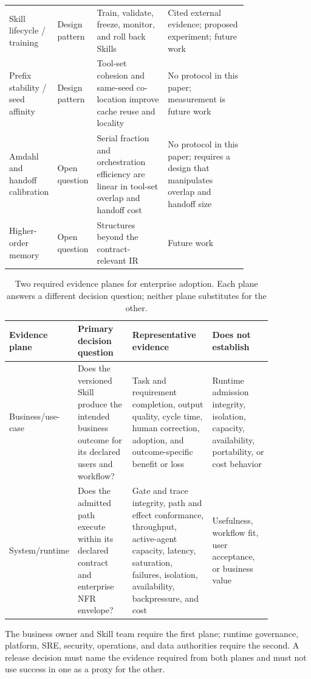 \begin{table}[t]
\begin{tabular}{lp{0.14\linewidth}p{0.30\linewidth}p{0.34\linewidth}}
Skill lifecycle / training & Design pattern & Train, validate, freeze, monitor, and roll back Skills & Cited external evidence; proposed experiment; future work \\
Prefix stability / seed affinity & Design pattern & Tool-set cohesion and same-seed co-location improve cache reuse and locality & No protocol in this paper; measurement is future work \\
Amdahl and handoff calibration & Open question & Serial fraction and orchestration efficiency are linear in tool-set overlap and handoff cost & No protocol in this paper; requires a design that manipulates overlap and handoff size \\
Higher-order memory & Open question & Structures beyond the contract-relevant IR & Future work \\
\hline
\end{tabular}
\end{table}

\begin{table}[t]
\centering
\caption{Two required evidence planes for enterprise adoption. Each plane answers a different decision question; neither plane substitutes for the other.}
\label{tab:evidence-planes}
\begin{tabular}{lp{0.25\linewidth}p{0.34\linewidth}p{0.27\linewidth}}
\hline
Evidence plane & Primary decision question & Representative evidence & Does not establish \\
\hline
Business/use-case & Does the versioned Skill produce the intended business outcome for its declared users and workflow? & Task and requirement completion, output quality, cycle time, human correction, adoption, and outcome-specific benefit or loss & Runtime admission integrity, isolation, capacity, availability, portability, or cost behavior \\
System/runtime & Does the admitted path execute within its declared contract and enterprise NFR envelope? & Gate and trace integrity, path and effect conformance, throughput, active-agent capacity, latency, saturation, failures, isolation, availability, backpressure, and cost & Usefulness, workflow fit, user acceptance, or business value \\
\hline
\end{tabular}
\end{table}

The business owner and Skill team require the first plane; runtime governance, platform, SRE, security, operations, and data authorities require the second. A release decision must name the evidence required from both planes and must not use success in one as a proxy for the other.

